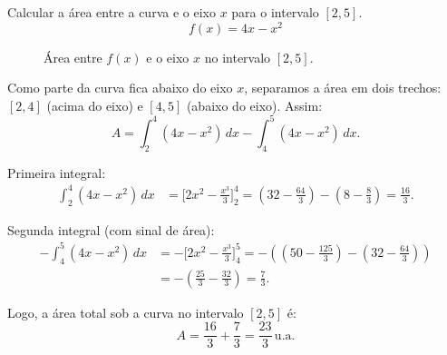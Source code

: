 \begin{exercicio}
Calcular a área entre a curva e o eixo \(x\) para o intervalo \([2,5]\).
\[
f(x)=4x-x^2
\]

\begin{figure}[H]
  \centering
  \caption{Área entre $f(x)$ e o eixo $x$ no intervalo $[2,5]$.}
  \label{area1}
\end{figure}

Como parte da curva fica abaixo do eixo \(x\), separamos a área em dois trechos:
\([2,4]\) (acima do eixo) e \([4,5]\) (abaixo do eixo). Assim:
\[
A=\int_{2}^{4}(4x-x^2)\,dx-\int_{4}^{5}(4x-x^2)\,dx.
\]

Primeira integral:
\begin{align*}
\int_{2}^{4}(4x-x^2)\,dx
&=\Big[2x^2-\frac{x^3}{3}\Big]_{2}^{4}
=\left(32-\frac{64}{3}\right)-\left(8-\frac{8}{3}\right)
=\frac{16}{3}.
\end{align*}

Segunda integral (com sinal de área):
\begin{align*}
-\int_{4}^{5}(4x-x^2)\,dx
&=-\Big[2x^2-\frac{x^3}{3}\Big]_{4}^{5}
=-\left(\left(50-\frac{125}{3}\right)-\left(32-\frac{64}{3}\right)\right)\\
&=-\left(\frac{25}{3}-\frac{32}{3}\right)
=\frac{7}{3}.
\end{align*}

Logo, a área total sob a curva no intervalo \([2,5]\) é:
\[
A=\frac{16}{3}+\frac{7}{3}=\boxed{\frac{23}{3}\,\text{u.a.}}
\]
\end{exercicio}


